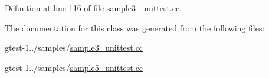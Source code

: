 \-Definition at line 116 of file sample3\-\_\-unittest.\-cc.



\-The documentation for this class was generated from the following files\-:\begin{DoxyCompactItemize}
\item 
gtest-\/1../samples/\hyperlink{sample3__unittest_8cc}{sample3\-\_\-unittest.\-cc}\item 
gtest-\/1../samples/\hyperlink{sample5__unittest_8cc}{sample5\-\_\-unittest.\-cc}\end{DoxyCompactItemize}
